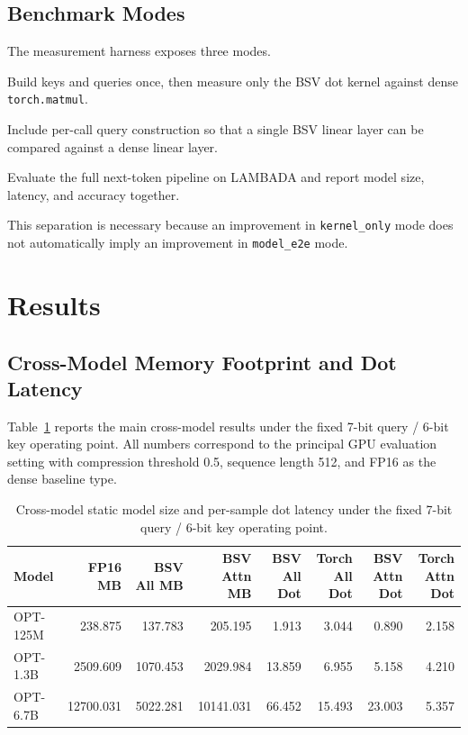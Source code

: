 \subsection{Benchmark Modes}
The measurement harness exposes three modes.
\begin{description}[leftmargin=2em,style=nextline]
\item[\texttt{kernel\_only}] Build keys and queries once, then measure only the BSV dot kernel against dense \texttt{torch.matmul}.
\item[\texttt{linear\_e2e}] Include per-call query construction so that a single BSV linear layer can be compared against a dense linear layer.
\item[\texttt{model\_e2e}] Evaluate the full next-token pipeline on LAMBADA and report model size, latency, and accuracy together.
\end{description}
This separation is necessary because an improvement in \texttt{kernel\_only} mode does not automatically imply an improvement in \texttt{model\_e2e} mode.

\section{Results}\label{sec:results}
\subsection{Cross-Model Memory Footprint and Dot Latency}
Table~\ref{tab:crossmodel-latency} reports the main cross-model results under the fixed 7-bit query / 6-bit key operating point. All numbers correspond to the principal GPU evaluation setting with compression threshold 0.5, sequence length 512, and FP16 as the dense baseline type.

\begin{table}[H]
\centering
\caption{Cross-model static model size and per-sample dot latency under the fixed 7-bit query / 6-bit key operating point.}
\label{tab:crossmodel-latency}
\begin{tabular}{lrrrrrrr}
\toprule
Model & FP16 MB & BSV All MB & BSV Attn MB & BSV All Dot & Torch All Dot & BSV Attn Dot & Torch Attn Dot \\
\midrule
OPT-125M & 238.875 & 137.783 & 205.195 & 1.913 & 3.044 & 0.890 & 2.158 \\
OPT-1.3B & 2509.609 & 1070.453 & 2029.984 & 13.859 & 6.955 & 5.158 & 4.210 \\
OPT-6.7B & 12700.031 & 5022.281 & 10141.031 & 66.452 & 15.493 & 23.003 & 5.357 \\
\bottomrule
\end{tabular}
\end{table}

